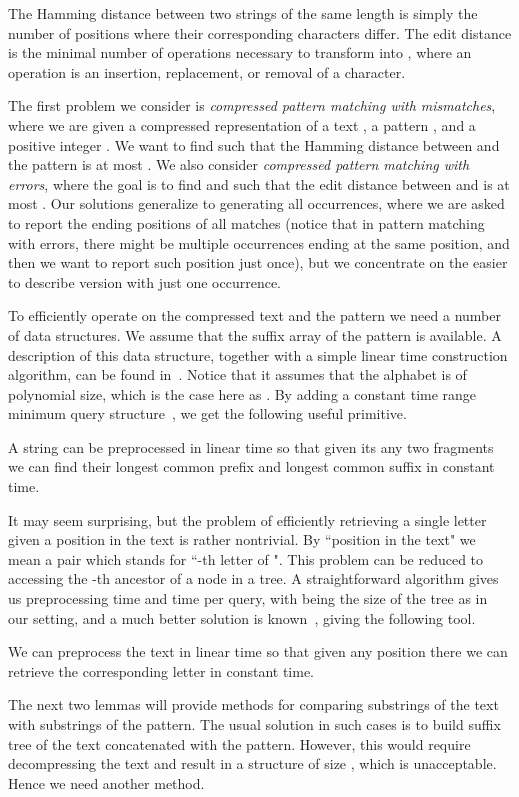 \documentclass[runningheads]{llncs}
\begin{document}
The Hamming distance between two strings of the same length is simply the number of positions where their corresponding characters differ. The edit distance  is the minimal number of operations necessary to transform  into , where an operation is an insertion, replacement, or removal of a character.

The first problem we consider is {\it compressed pattern matching with mismatches}, where we are given a compressed representation of a text , a pattern , and a positive integer . We want to find  such that the Hamming distance between  and the pattern is at most . 
We also consider {\it compressed pattern matching with errors}, where the goal is to find  and  such that the edit distance between  and  is at most .
Our solutions generalize to generating all occurrences, where we are asked to report the ending positions of all matches (notice that in pattern matching with errors, there might
be multiple occurrences ending at the same position, and then we want to report such position just once), but we concentrate on the easier to describe version with just one
occurrence.

To efficiently operate on the compressed text and the pattern we need a number of data structures. We assume that the suffix array of the pattern is available. A description of this data structure, together with a simple linear time construction algorithm, can be found in~\cite{Karkkainen}. Notice that it assumes that the alphabet is of polynomial size, which is the case here as . By adding a constant time range minimum query structure~\cite{Bender}, we get the following useful primitive.
\begin{lemma}\label{lemma:lcapattern}
A string can be preprocessed in linear time so that given its any two fragments we can find their longest common prefix and longest common suffix in constant time.
\end{lemma}
It may seem surprising, but the problem of efficiently retrieving a single letter given a position in the text is rather nontrivial. By ``position in the text" we mean a pair 
which stands for ``-th letter of ". This problem can be reduced to accessing the -th ancestor of a node in a tree. A straightforward algorithm gives us  preprocessing time and  time per query, with  being the size of the tree as in our setting, and a much better solution is known~\cite{AlstrupAncestor}, giving the following tool.
\begin{lemma}\label{lemma:lettertext}
We can preprocess the text in linear time so that given any position there we can retrieve the corresponding letter in constant time.
\end{lemma}
The next two lemmas will provide methods for comparing substrings of the text with substrings of the pattern. The usual solution in such cases is to build suffix tree of the text concatenated with the pattern. However, this would require decompressing the text and result in a structure of size , which is unacceptable. Hence we need another method.
\end{document}

